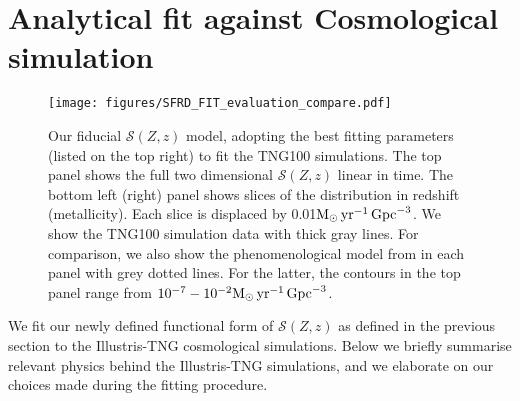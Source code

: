 \documentclass[twocolumn]{aastex631}
\newcommand{\Msun}{\ensuremath{\rm{M}_{\odot}}\xspace}
\newcommand{\yr}{\ensuremath{\,\rm{yr}}\xspace}
\newcommand{\Mpc}{\ensuremath{\,\rm{Gpc}}\xspace}
\newcommand{\SFRDzZ}{\ensuremath{\mathcal{S}(Z,z)}\xspace}
\begin{document}
\section{Analytical fit against Cosmological simulation \label{sec: fit against tng}}

\begin{figure*}
\texttt{[image: figures/SFRD\_FIT\_evaluation\_compare.pdf]}
\caption{Our fiducial \SFRDzZ model, adopting the best fitting parameters (listed on the top right) to fit the TNG100 simulations.
The top panel shows the full two dimensional \SFRDzZ linear in time. The bottom left (right) panel shows slices of the distribution in redshift (metallicity). Each slice is displaced by 0.01$\Msun \yr^{-1}\Mpc^{-3}$. We show the TNG100 simulation data with thick gray lines. 
For comparison, we also show the phenomenological model from \protect\cite{Neijssel+2019} in each panel with grey dotted lines. For the latter, the contours in the top panel range from $10^{-7} - 10^{-2} \Msun \yr^{-1}\Mpc^{-3}$.
 \label{fig: fit SFRD}}
\end{figure*}
We fit our newly defined functional form of \SFRDzZ as defined in the previous section to the Illustris-TNG cosmological simulations. Below we briefly summarise relevant physics behind the Illustris-TNG simulations, and we elaborate on our choices made during the fitting procedure.

\end{document}
